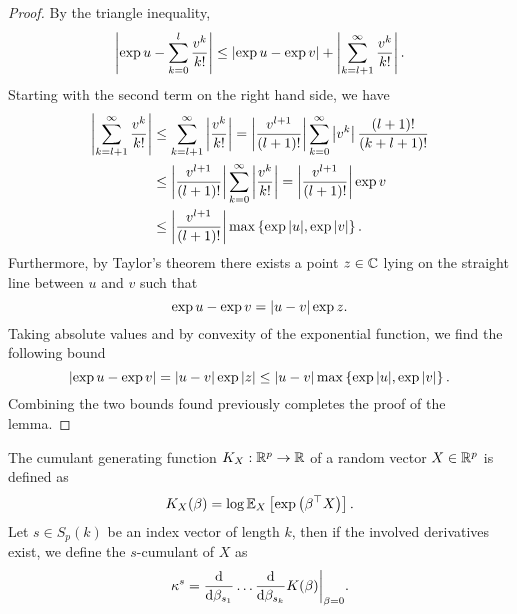 \begin{proof}
    By the triangle inequality,
    \begin{equation*}
        \left|\exp{u} - \sum_{k=0}^l \frac{v^k}{k!}\right| \leq \left|\exp{u} - \exp{v}\right| + \left|\sum_{k=l+1}^\infty \frac{v^k}{k!}\right|.
    \end{equation*}
    Starting with the second term on the right hand side, we have
    \begin{align*}
        \left|\sum_{k=l+1}^\infty \frac{v^k}{k!}\right| 
        & \leq \sum_{k=l+1}^\infty \left|\frac{v^k}{k!}\right| 
        = \left|\frac{v^{l+1}}{(l+1)!}\right| \sum_{k=0}^\infty \left|v^k\right| \frac{(l+1)!}{(k + l + 1)!} \\
        & \leq \left|\frac{v^{l+1}}{(l+1)!}\right| \sum_{k=0}^\infty \left|\frac{v^k}{k!}\right|
        = \left|\frac{v^{l+1}}{(l+1)!}\right| \exp v\\
        &\leq \left|\frac{v^{l+1}}{(l+1)!}\right| \max \left\{ \exp{|u|}, \exp{|v|} \right\}.
    \end{align*}
    Furthermore, by Taylor's theorem there exists a point $z \in \mathbb{C}$ lying on the straight line between $u$ and $v$ such that
    \begin{equation*}
        \exp u - \exp v = \left|u - v\right| \exp z.
    \end{equation*}
    Taking absolute values and by convexity of the exponential function, we find the following bound
    \begin{equation*}
        \left|\exp u - \exp v\right| = \left|u - v\right| \exp |z| \leq \left|u - v\right| \max \left\{ \exp{|u|}, \exp{|v|} \right\}.
    \end{equation*}
    Combining the two bounds found previously completes the proof of the lemma.
\end{proof}

\begin{definition}
    The cumulant generating function $K_X : \mathbb{R}^p \rightarrow \mathbb{R}$ of a random vector $X \in \mathbb{R}^p$ is defined as 
    \begin{equation*}
        K_X(\beta) = \log \mathbb{E}_{X}\left[\exp\left(\beta^\top X\right)\right].
    \end{equation*}
    Let $s \in S_p(k)$ be an index vector of length $k$, then if the involved derivatives exist, we define the $s$-cumulant of $X$ as
    \begin{equation*}
        \kappa^s = \frac{\text{d}}{\text{d} \beta_{s_1}}\ldots\frac{\text{d}}{\text{d} \beta_{s_k}} K(\beta) \bigg|_{\beta=0}.
    \end{equation*}
\end{definition}

